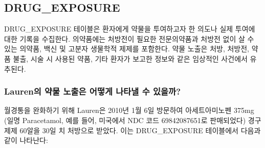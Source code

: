 \documentclass[11pt]{book}
\theoremstyle{definition}
\theoremstyle{definition}
\theoremstyle{definition}
\theoremstyle{remark}
\begin{document}
\subsection{DRUG\_EXPOSURE}\label{drugExposure}

DRUG\_EXPOSURE 테이블은 환자에게 약물을 투여하고자 한 의도나 실제 투여에
대한 기록을 수집한다. 의약품에는 처방전이 필요한 전문의약품과 처방전
없이 살 수 있는 의약품, 백신 및 고분자 생물학적 제제를 포함한다. 약물
노출은 처방, 처방전, 약품 불출, 시술 시 사용된 약품, 기타 환자가 보고한
정보와 같은 임상적인 사건에서 유추된다.

\subsubsection*{Lauren의 약물 노출은 어떻게 나타낼 수
있을까?}\label{lauren------}

월경통을 완화하기 위해 Lauren은 2010년 1월 6일 방문하여 아세트아미노펜
375mg (일명 Paracetamol, 예를 들어, 미국에서 NDC 코드 69842087651로
판매되었다) 경구 제제 60알을 30일 치 처방으로 받았다. 이는
DRUG\_EXPOSURE 테이블에서 다음과 같이 나타난다:
\end{document}
